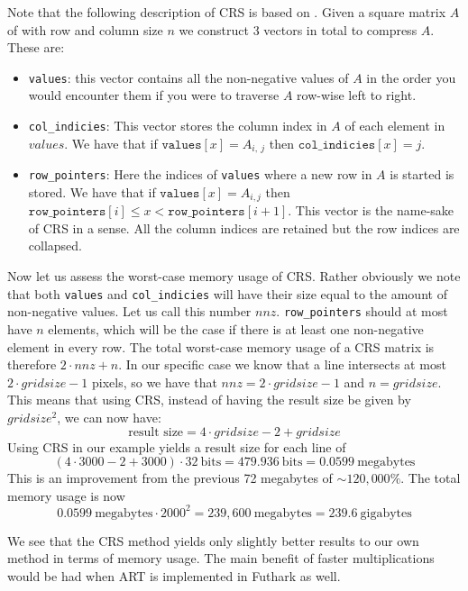 Note that the following description of CRS is based on \cite{CRS_slide}. 
Given a square matrix $A$ of with row and column size $n$ we construct 3 vectors in total to compress $A$. These are:
\begin{itemize}
    \item\texttt{values}: this vector contains all the non-negative values of $A$ in the order you would encounter them if you were to traverse $A$ row-wise left to right.
    \item\texttt{col\_indicies}: This vector stores the column index in $A$ of each element in $values$. 
    We have that if $\texttt{values}[x] = A_{i,~j}$ then $\texttt{col\_indicies}[x] = j$.
    \item\texttt{row\_pointers}: Here the indices of \texttt{values} where a new row in $A$ is started is stored. We have that if $\texttt{values}[x] = A_{i, j}$ then $\texttt{row\_pointers}[i] \leq x < \texttt{row\_pointers}[i+1]$. This vector is the name-sake of CRS in a sense. All the column indices are retained but the row indices are collapsed.  
\end{itemize}
Now let us assess the worst-case memory usage of CRS. Rather obviously we note that both \texttt{values} and \texttt{col\_indicies} will have their size equal to the amount of non-negative values.  Let us call this number $nnz$. \texttt{row\_pointers} should at most have $n$ elements, which will be the case if there is at least one non-negative element in every row. The total worst-case memory usage of a CRS matrix is therefore $2 \cdot nnz + n$. In our specific case we know that a line intersects at most $2 \cdot gridsize - 1$ pixels, so we have that $nnz = 2 \cdot gridsize - 1$ and $n = gridsize$. This means that using CRS, instead of having the result size be given by $gridsize^2$, we can now have:
$$\text{result size} = 4 \cdot gridsize - 2 + gridsize$$
Using CRS in our example yields a result size for each line of 
$$(4 \cdot 3000 - 2 + 3000) \cdot 32~\text{bits} = 479.936~\text{bits} = 0.0599~\text{megabytes}$$
This is an improvement from the previous 72 megabytes of $\sim 120,000 \%$. The total memory usage is now
$$0.0599~\text{megabytes} \cdot 2000^2 = 239,600~\text{megabytes} = 239.6 ~\text{gigabytes}$$  

We see that the CRS method yields only slightly better results to our own method in terms of memory usage. The main benefit of faster multiplications would be had when ART is implemented in Futhark as well. 